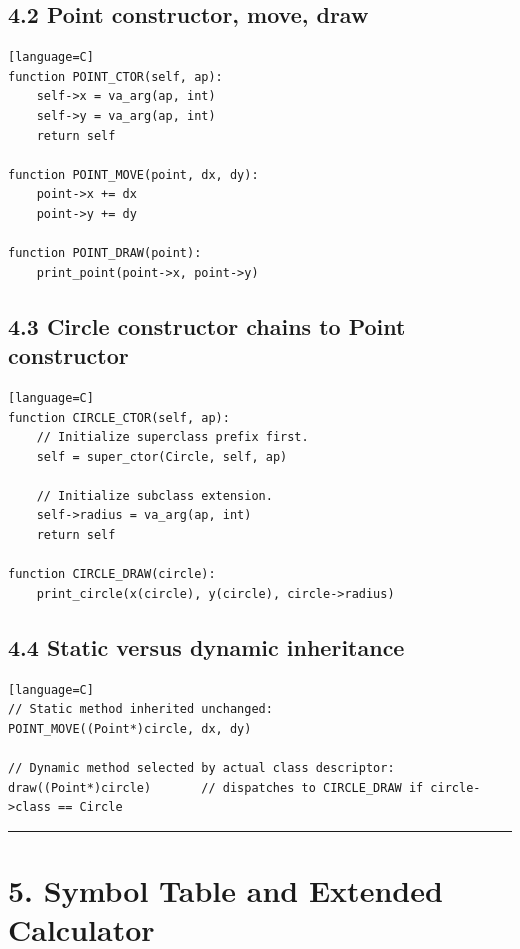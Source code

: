 \documentclass[11pt]{article}
\begin{document}
\subsection{4.2 Point constructor, move,
draw}\label{point-constructor-move-draw}

\begin{verbatim}[language=C]
function POINT_CTOR(self, ap):
    self->x = va_arg(ap, int)
    self->y = va_arg(ap, int)
    return self

function POINT_MOVE(point, dx, dy):
    point->x += dx
    point->y += dy

function POINT_DRAW(point):
    print_point(point->x, point->y)
\end{verbatim}

\subsection{4.3 Circle constructor chains to Point
constructor}\label{circle-constructor-chains-to-point-constructor}

\begin{verbatim}[language=C]
function CIRCLE_CTOR(self, ap):
    // Initialize superclass prefix first.
    self = super_ctor(Circle, self, ap)

    // Initialize subclass extension.
    self->radius = va_arg(ap, int)
    return self

function CIRCLE_DRAW(circle):
    print_circle(x(circle), y(circle), circle->radius)
\end{verbatim}

\subsection{4.4 Static versus dynamic
inheritance}\label{static-versus-dynamic-inheritance}

\begin{verbatim}[language=C]
// Static method inherited unchanged:
POINT_MOVE((Point*)circle, dx, dy)

// Dynamic method selected by actual class descriptor:
draw((Point*)circle)       // dispatches to CIRCLE_DRAW if circle->class == Circle
\end{verbatim}

\begin{center}\rule{0.5\linewidth}{0.5pt}\end{center}

\section{5. Symbol Table and Extended
Calculator}\label{symbol-table-and-extended-calculator}
\end{document}
